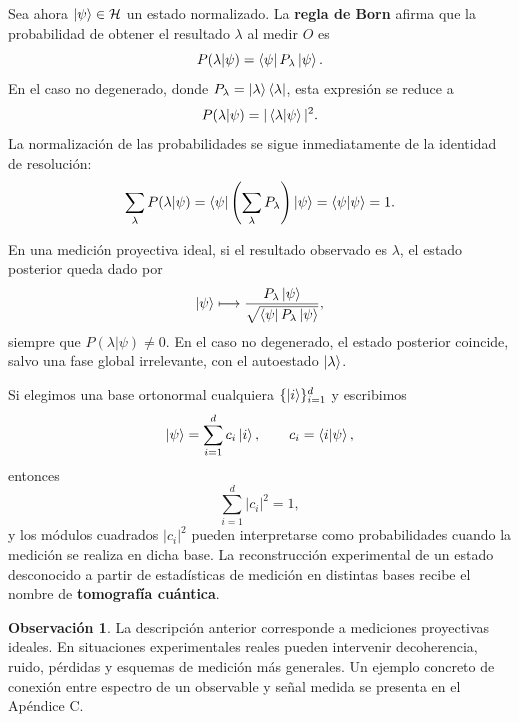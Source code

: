 \documentclass[12pt,a4paper]{article}
\theoremstyle{definition}
\newtheorem{observacion}[definicion]{Observación}
\theoremstyle{plain}
\theoremstyle{remark}
\newcommand{\Hil}{\mathcal{H}}
\providecommand{\op}[1]{\hat{#1}}
\begin{document}
Sea ahora $\ket{\psi}\in\Hil$ un estado normalizado. La \textbf{regla de Born} afirma que la probabilidad de obtener el resultado $\lambda$ al medir $\op{O}$ es
\begin{equation}\label{eq:born-main}
    P(\lambda|\psi)=\bra{\psi}P_\lambda\ket{\psi}.
\end{equation}
En el caso no degenerado, donde $P_\lambda=\ket{\lambda}\bra{\lambda}$, esta expresión se reduce a
\begin{equation*}
    P(\lambda|\psi)=|\braket{\lambda|\psi}|^2.
\end{equation*}
La normalización de las probabilidades se sigue inmediatamente de la identidad de resolución:
\begin{equation*}
    \sum_{\lambda}P(\lambda|\psi)
    =
    \bra{\psi}\left(\sum_{\lambda}P_\lambda\right)\ket{\psi}
    =
    \braket{\psi|\psi}
    =
    1.
\end{equation*}

En una medición proyectiva ideal, si el resultado observado es $\lambda$, el estado posterior queda dado por
\begin{equation*}
    \ket{\psi}\longmapsto \frac{P_\lambda\ket{\psi}}{\sqrt{\bra{\psi}P_\lambda\ket{\psi}}},
\end{equation*}
siempre que $P(\lambda|\psi)\neq 0$. En el caso no degenerado, el estado posterior coincide, salvo una fase global irrelevante, con el autoestado $\ket{\lambda}$.

Si elegimos una base ortonormal cualquiera $\{\ket{i}\}_{i=1}^{d}$ y escribimos
\begin{equation*}
    \ket{\psi}=\sum_{i=1}^{d}c_i\ket{i},
    \qquad
    c_i=\braket{i|\psi},
\end{equation*}
entonces
\begin{equation*}
    \sum_{i=1}^{d}|c_i|^2=1,
\end{equation*}
y los módulos cuadrados $|c_i|^2$ pueden interpretarse como probabilidades cuando la medición se realiza en dicha base. La reconstrucción experimental de un estado desconocido a partir de estadísticas de medición en distintas bases recibe el nombre de \textbf{tomografía cuántica}.

\begin{observacion}
La descripción anterior corresponde a mediciones proyectivas ideales. En situaciones experimentales reales pueden intervenir decoherencia, ruido, pérdidas y esquemas de medición más generales. Un ejemplo concreto de conexión entre espectro de un observable y señal medida se presenta en el Apéndice C.
\end{observacion}
\end{document}
